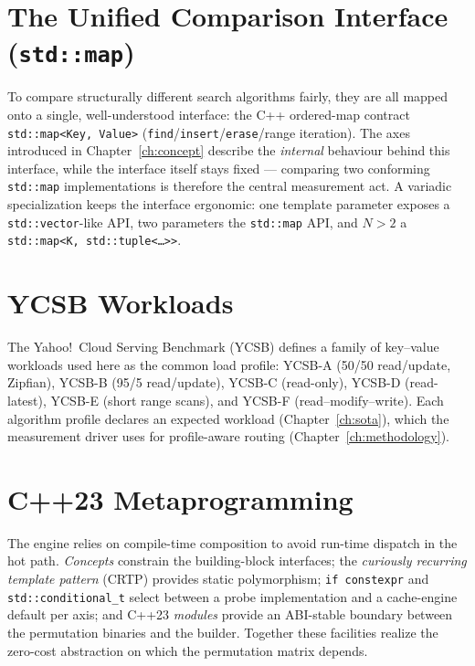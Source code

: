 \section{The Unified Comparison Interface (\texorpdfstring{\texttt{std::map}}{std::map})}\label{sec:stdmap-interface}

To compare structurally different search algorithms fairly, they are all mapped onto a
single, well-understood interface: the C++ ordered-map contract
\texttt{std::map<Key,\,Value>} (\texttt{find}/\texttt{insert}/\texttt{erase}/range
iteration). The axes introduced in Chapter~\ref{ch:concept} describe the \emph{internal}
behaviour behind this interface, while the interface itself stays fixed --- comparing two
conforming \texttt{std::map} implementations is therefore the central measurement act. A
variadic specialization keeps the interface ergonomic: one template parameter exposes a
\texttt{std::vector}-like API, two parameters the \texttt{std::map} API, and $N>2$ a
\texttt{std::map<K,\,std::tuple<\ldots>>}.

\section{YCSB Workloads}\label{sec:ycsb}

The Yahoo!\ Cloud Serving Benchmark (YCSB) defines a family of key--value workloads used
here as the common load profile: YCSB-A (50/50 read/update, Zipfian), YCSB-B (95/5
read/update), YCSB-C (read-only), YCSB-D (read-latest), YCSB-E (short range scans), and
YCSB-F (read--modify--write). Each algorithm profile declares an expected workload
(Chapter~\ref{ch:sota}), which the measurement driver uses for profile-aware routing
(Chapter~\ref{ch:methodology}).

\section{C++23 Metaprogramming}\label{sec:cpp23}

The engine relies on compile-time composition to avoid run-time dispatch in the hot path.
\emph{Concepts} constrain the building-block interfaces; the \emph{curiously recurring
template pattern} (CRTP) provides static polymorphism; \texttt{if~constexpr} and
\texttt{std::conditional\_t} select between a probe implementation and a cache-engine
default per axis; and C++23 \emph{modules} provide an ABI-stable boundary between the
permutation binaries and the builder. Together these facilities realize the
zero-cost abstraction on which the permutation matrix depends.
